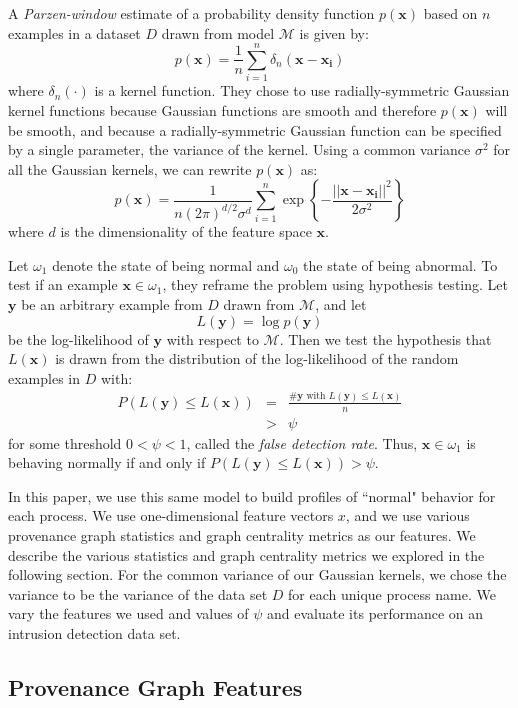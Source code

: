 \documentclass[10pt,twocolumn]{article}
\newcommand{\m}[1]{\mathbf{#1}}
\begin{document}
A {\em Parzen-window} estimate of a probability density function $p(\m{x})$
based on $n$ examples in a dataset $D$ drawn from model $\mathcal{M}$ is given by:
$$p(\m{x}) = \frac{1}{n} \sum_{i=1}^n \delta_n (\m{x} - \m{x_i})$$
where $\delta_n(\cdot)$ is a kernel function. They chose to use radially-symmetric Gaussian kernel functions because
Gaussian functions are smooth and therefore $p(\m{x})$ will be smooth, and because a radially-symmetric Gaussian function
can be specified by a single parameter, the variance of the kernel. Using a common variance $\sigma^2$ for all
the Gaussian kernels, we can rewrite $p(\m{x})$ as:
$$p(\m{x}) = \frac{1}{n(2\pi)^{d/2} \sigma^d} \sum_{i=1}^n  \exp \left\{  - \frac{|| \m{x} - \m{x_i}||^2}{2 \sigma^2}  \right\}$$
where $d$ is the dimensionality of the feature space $\m{x}$.

Let $\omega_1$ denote the state of being normal and $\omega_0$ the state of being abnormal.
To test if an example $\m{x} \in \omega_1$, they reframe the problem using hypothesis testing. Let $\m{y}$ be
an arbitrary example from $D$ drawn from $\mathcal{M}$, and let 
$$L(\m{y}) = \log p(\m{y})$$
be the log-likelihood of $\m{y}$ with respect to $\mathcal{M}$. Then we test the hypothesis that
$L(\m{x})$ is drawn from the distribution of the log-likelihood of the random examples in $D$ with:
\begin{eqnarray*}
P(L(\m{y}) \leq L(\m{x})) 
&=&  \frac{\#\m{y} \mbox { with } L(\m{y}) \leq L(\m{x})}{n} \\
&>& \psi
\end{eqnarray*}
for some threshold $0 < \psi < 1$, called the {\em false detection rate}. 
Thus, $\m{x} \in \omega_1$ is behaving normally if and only if $P(L(\m{y}) \leq L(\m{x})) > \psi$. 

In this paper, we use this same model to build profiles of ``normal" behavior for each process. We use
one-dimensional feature vectors $x$, and we use various provenance graph statistics and graph
centrality metrics as our features. We describe the various statistics and graph centrality metrics we explored
in the following section. For the common variance of our Gaussian kernels, we chose
the variance to be the variance of the data set $D$ for each unique process name. 
We vary the features we used and values of $\psi$ and evaluate its performance on an intrusion detection data set.

\subsection{Provenance Graph Features}
\end{document}
